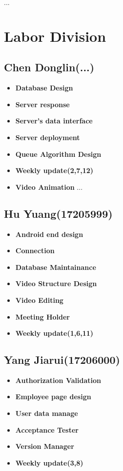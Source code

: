 \documentclass[a4paper]{article}
\begin{document}
...
\section{Labor Division}
\newpage
\subsection{Chen Donglin(...)}
\begin{itemize}
    \item \textbf{Database Design}
    \item \textbf{Server response}
    \item \textbf{Server's data interface}
    \item \textbf{Server deployment}
     \item \textbf{Queue Algorithm Design}
      \item \textbf{Weekly update(2,7,12)}
      \item \textbf{Video Animation}
    ...
\end{itemize}
\subsection{Hu Yuang(17205999)}
\begin{itemize}
    \item \textbf{Android end design}
    \item \textbf{Connection}
    \item \textbf{Database Maintainance}
    \item \textbf{Video Structure Design}
    \item \textbf{Video Editing}
    \item \textbf{Meeting Holder}
    \item \textbf{Weekly update(1,6,11)}
\end{itemize}
\subsection{Yang Jiarui(17206000)}
\begin{itemize}
    \item \textbf{Authorization Validation}
     \item \textbf{Employee page design}
    \item \textbf{User data manage}
    \item \textbf{Acceptance Tester}
    \item \textbf{Version Manager}
    \item \textbf{Weekly update(3,8)}
\end{itemize}
\end{document}
